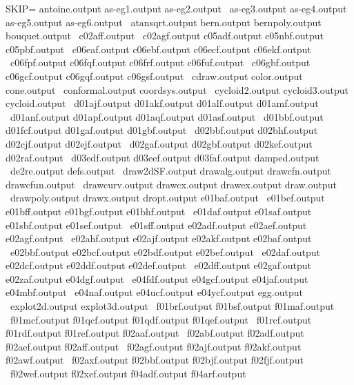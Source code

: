 \documentclass{article}
\begin{document}
SKIP= antoine.output as-eg1.output as-eg2.output    \
      as-eg3.output    as-eg4.output    as-eg5.output    as-eg6.output    \
      atansqrt.output  bern.output      bernpoly.output  bouquet.output   \
      c02aff.output    \
      c02agf.output    c05adf.output    c05nbf.output    c05pbf.output    \
      c06eaf.output    c06ebf.output    c06ecf.output    c06ekf.output    \
      c06fpf.output    c06fqf.output    c06frf.output    c06fuf.output    \
      c06gbf.output    c06gcf.output    c06gqf.output    c06gsf.output    \
      cdraw.output     color.output     cone.output      \
      conformal.output coordsys.output  \
      cycloid2.output  cycloid3.output  cycloid.output   \
      d01ajf.output    d01akf.output    d01alf.output    d01amf.output    \
      d01anf.output    d01apf.output    d01aqf.output    d01asf.output    \
      d01bbf.output    d01fcf.output    d01gaf.output    d01gbf.output    \
      d02bbf.output    d02bhf.output    d02cjf.output    d02ejf.output    \
      d02gaf.output    d02gbf.output    d02kef.output    d02raf.output    \
      d03edf.output    d03eef.output    d03faf.output    damped.output    \
      de2re.output     defs.output      \
      draw2dSF.output  drawalg.output   drawcfn.output   drawcfun.output  \
      drawcurv.output  drawcx.output    drawex.output    draw.output      \
      drawpoly.output  drawx.output     dropt.output     e01baf.output    \
      e01bef.output    e01bff.output    e01bgf.output    e01bhf.output    \
      e01daf.output    e01saf.output    e01sbf.output    e01sef.output    \
      e01sff.output    e02adf.output    e02aef.output    e02agf.output    \
      e02ahf.output    e02ajf.output    e02akf.output    e02baf.output    \
      e02bbf.output    e02bcf.output    e02bdf.output    e02bef.output    \
      e02daf.output    e02dcf.output    e02ddf.output    e02def.output    \
      e02dff.output    e02gaf.output    e02zaf.output    e04dgf.output    \
      e04fdf.output    e04gcf.output    e04jaf.output    e04mbf.output    \
      e04naf.output    e04ucf.output    e04ycf.output    egg.output       \
      explot2d.output  explot3d.output  \
      f01brf.output    f01bsf.output    f01maf.output    \
      f01mcf.output    f01qcf.output    f01qdf.output    f01qef.output    \
      f01rcf.output    f01rdf.output    f01ref.output    f02aaf.output    \
      f02abf.output    f02adf.output    f02aef.output    f02aff.output    \
      f02agf.output    f02ajf.output    f02akf.output    f02awf.output    \
      f02axf.output    f02bbf.output    f02bjf.output    f02fjf.output    \
      f02wef.output    f02xef.output    f04adf.output    f04arf.output    \
\end{document}
